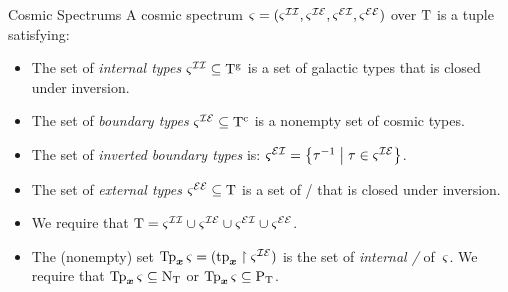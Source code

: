 \documentclass{beamer}
\begin{document}
\begin{frame}{Cosmic Spectrums}
A cosmic spectrum $\varsigma=(\varsigma^{\mathcal{I}\mathcal{I}},\varsigma^{\mathcal{I}\mathcal{E}},\varsigma^{\mathcal{E}\mathcal{I}},\varsigma^{\mathcal{E}\mathcal{E}})$ over $\mathrm{T}$
is a tuple satisfying:
\begin{itemize}
  \item[\condcspII]\label{cond:cspII}
  The set of \emph{internal types} $\varsigma^{\mathcal{I}\mathcal{I}} \subseteq \mathrm{T}^{\mathrm{g}}$ is a set of
  galactic types that is closed under inversion.
  
  \item[\condcspIE]\label{cond:cspIE}
  The set of \emph{boundary types} $\varsigma^{\mathcal{I}\mathcal{E}} \subseteq \mathrm{T}^{\mathrm{c}}$ is a nonempty set
  of cosmic types.
  
  \item[\condcspEI]\label{cond:cspEI}
  The set of \emph{inverted boundary types} is:
  $\varsigma^{\mathcal{E}\mathcal{I}} = \left\{\tau^{-1}\mathrel{}\middle|\mathrel{}\tau\in\varsigma^{\mathcal{I}\mathcal{E}}\right\}$.
  
  \item[\condcspEE]\label{cond:cspEE}
  The set of \emph{external types} $\varsigma^{\mathcal{E}\mathcal{E}} \subseteq \mathrm{T}$ is a set of
  \twotypes/ that is closed under inversion.

  \item[\condcspT]\label{cond:cspT}
  We require that
  $\mathrm{T} = \varsigma^{\mathcal{I}\mathcal{I}} \cup \varsigma^{\mathcal{I}\mathcal{E}} \cup \varsigma^{\mathcal{E}\mathcal{I}} \cup \varsigma^{\mathcal{E}\mathcal{E}}$.

  \item[\condcspNP]\label{cond:cspNP}
  The (nonempty) set $\operatorname{Tp}_{\bm{x}}{\varsigma} = (\mathrm{tp}_{\bm{x}}\restriction{\varsigma^{\mathcal{I}\mathcal{E}}})$ is
  the set of \emph{internal \onetypes/} of~$\varsigma$.
  We require that $\operatorname{Tp}_{\bm{x}}{\varsigma} \subseteq {\mathrm{N}}_{\mathrm{T}}$ or $\operatorname{Tp}_{\bm{x}}{\varsigma} \subseteq {\mathrm{P}}_{\mathrm{T}}$.
\end{itemize}
\end{frame}
\end{document}
